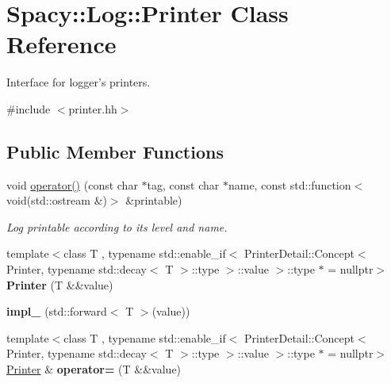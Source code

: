 \hypertarget{classSpacy_1_1Log_1_1Printer}{\section{Spacy\-:\-:Log\-:\-:Printer Class Reference}
\label{classSpacy_1_1Log_1_1Printer}
}


Interface for logger's printers.  




{\ttfamily \#include $<$printer.\-hh$>$}

\subsection*{Public Member Functions}
\begin{DoxyCompactItemize}
\item 
void \hyperlink{classSpacy_1_1Log_1_1Printer_a7cbc9a51fb4caf02a4fd46de907af6e9}{operator()} (const char $\ast$tag, const char $\ast$name, const std\-::function$<$ void(std\-::ostream \&)$>$ \&printable)
\begin{DoxyCompactList}\small\item\em Log printable according to its level and name. \end{DoxyCompactList}\item 
\hypertarget{classSpacy_1_1Log_1_1Printer_a808ff6fbaed9e16053d829b9ac72a052}{{\footnotesize template$<$class T , typename std\-::enable\-\_\-if$<$ Printer\-Detail\-::\-Concept$<$ Printer, typename std\-::decay$<$ T $>$\-::type $>$\-::value $>$\-::type $\ast$  = nullptr$>$ }\\{\bfseries Printer} (T \&\&value)}\label{classSpacy_1_1Log_1_1Printer_a808ff6fbaed9e16053d829b9ac72a052}

\item 
\hypertarget{classSpacy_1_1Log_1_1Printer_a2686673d32928c40bcd9db83e31a45d5}{{\bfseries impl\-\_\-} (std\-::forward$<$ T $>$(value))}\label{classSpacy_1_1Log_1_1Printer_a2686673d32928c40bcd9db83e31a45d5}

\item 
\hypertarget{classSpacy_1_1Log_1_1Printer_ae357ead97367f658a1debecbd541e53f}{{\footnotesize template$<$class T , typename std\-::enable\-\_\-if$<$ Printer\-Detail\-::\-Concept$<$ Printer, typename std\-::decay$<$ T $>$\-::type $>$\-::value $>$\-::type $\ast$  = nullptr$>$ }\\\hyperlink{classSpacy_1_1Log_1_1Printer}{Printer} \& {\bfseries operator=} (T \&\&value)}\label{classSpacy_1_1Log_1_1Printer_ae357ead97367f658a1debecbd541e53f}


\end{DoxyCompactItemize}
